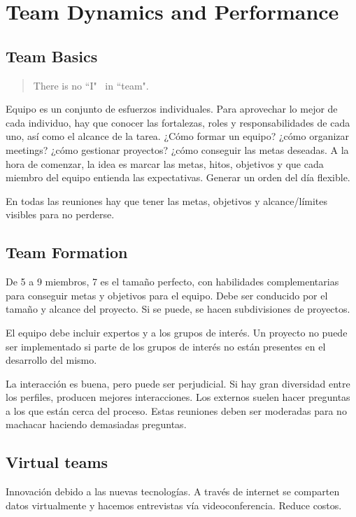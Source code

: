 \documentclass[]{article}
\begin{document}
\section{Team Dynamics and Performance}
\subsection{Team Basics}

\begin{quote}
There is no ``I" \ in ``team".
\end{quote} Equipo es un conjunto de esfuerzos individuales. Para aprovechar lo mejor de cada individuo, hay que conocer las fortalezas, roles y responsabilidades de cada uno, así como el alcance de la tarea. ¿Cómo formar un equipo? ¿cómo organizar meetings? ¿cómo gestionar proyectos? ¿cómo conseguir las metas deseadas. A la hora de comenzar, la idea es marcar las metas, hitos, objetivos y que cada miembro del equipo entienda las expectativas. Generar un orden del día flexible.

En todas las reuniones hay que tener las metas, objetivos y alcance/límites visibles para no perderse.

\subsection{Team Formation}

De 5 a 9 miembros, 7 es el tamaño perfecto, con habilidades complementarias para conseguir metas y objetivos para el equipo. Debe ser conducido por el tamaño y alcance del proyecto. Si se puede, se hacen subdivisiones de proyectos.

El equipo debe incluir expertos y a los grupos de interés. Un proyecto no puede ser implementado si parte de los grupos de interés no están presentes en el desarrollo del mismo.

La interacción es buena, pero puede ser perjudicial. Si hay gran diversidad entre los perfiles, producen mejores interacciones. Los externos suelen hacer preguntas a los que están cerca del proceso. Estas reuniones deben ser moderadas para no machacar haciendo demasiadas preguntas.

\subsection{Virtual teams}

Innovación debido a las nuevas tecnologías. A través de internet se comparten datos virtualmente y hacemos entrevistas vía videoconferencia. Reduce costos.
\end{document}
